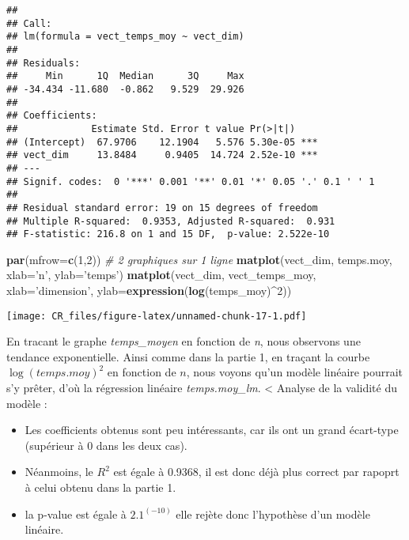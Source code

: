 \documentclass[
]{article}
\newenvironment{Shaded}{\begin{snugshade}}{\end{snugshade}}
\newcommand{\CommentTok}[1]{\textcolor[rgb]{0.56,0.35,0.01}{\textit{#1}}}
\newcommand{\DataTypeTok}[1]{\textcolor[rgb]{0.13,0.29,0.53}{#1}}
\newcommand{\DecValTok}[1]{\textcolor[rgb]{0.00,0.00,0.81}{#1}}
\newcommand{\KeywordTok}[1]{\textcolor[rgb]{0.13,0.29,0.53}{\textbf{#1}}}
\newcommand{\NormalTok}[1]{#1}
\newcommand{\OperatorTok}[1]{\textcolor[rgb]{0.81,0.36,0.00}{\textbf{#1}}}
\newcommand{\StringTok}[1]{\textcolor[rgb]{0.31,0.60,0.02}{#1}}
\providecommand{\tightlist}{%
  \setlength{\itemsep}{0pt}\setlength{\parskip}{0pt}}
\begin{document}
\begin{verbatim}
## 
## Call:
## lm(formula = vect_temps_moy ~ vect_dim)
## 
## Residuals:
##     Min      1Q  Median      3Q     Max 
## -34.434 -11.680  -0.862   9.529  29.926 
## 
## Coefficients:
##             Estimate Std. Error t value Pr(>|t|)    
## (Intercept)  67.9706    12.1904   5.576 5.30e-05 ***
## vect_dim     13.8484     0.9405  14.724 2.52e-10 ***
## ---
## Signif. codes:  0 '***' 0.001 '**' 0.01 '*' 0.05 '.' 0.1 ' ' 1
## 
## Residual standard error: 19 on 15 degrees of freedom
## Multiple R-squared:  0.9353, Adjusted R-squared:  0.931 
## F-statistic: 216.8 on 1 and 15 DF,  p-value: 2.522e-10
\end{verbatim}

\begin{Shaded}
\begin{Highlighting}[]
\KeywordTok{par}\NormalTok{(}\DataTypeTok{mfrow=}\KeywordTok{c}\NormalTok{(}\DecValTok{1}\NormalTok{,}\DecValTok{2}\NormalTok{)) }\CommentTok{# 2 graphiques sur 1 ligne}
\KeywordTok{matplot}\NormalTok{(vect_dim, temps.moy, }\DataTypeTok{xlab=}\StringTok{'n'}\NormalTok{, }\DataTypeTok{ylab=}\StringTok{'temps'}\NormalTok{)}
\KeywordTok{matplot}\NormalTok{(vect_dim, vect_temps_moy, }\DataTypeTok{xlab=}\StringTok{'dimension'}\NormalTok{, }\DataTypeTok{ylab=}\KeywordTok{expression}\NormalTok{(}\KeywordTok{log}\NormalTok{(temps_moy)}\OperatorTok{^}\DecValTok{2}\NormalTok{))}
\end{Highlighting}
\end{Shaded}

\texttt{[image: CR\_files/figure-latex/unnamed-chunk-17-1.pdf]}

En tracant le graphe \emph{temps\_moyen} en fonction de \emph{n}, nous
observons une tendance exponentielle. Ainsi comme dans la partie 1, en
traçant la courbe \(\log(temps.moy)^2\) en fonction de \(n\), nous
voyons qu'un modèle linéaire pourrait s'y prêter, d'où la régression
linéaire \emph{temps.moy\_lm}. \textless{} Analyse de la validité du
modèle :

\begin{itemize}
\tightlist
\item
  Les coefficients obtenus sont peu intéressants, car ils ont un grand
  écart-type (supérieur à 0 dans les deux cas).
\item
  Néanmoins, le \(R^2\) est égale à 0.9368, il est donc déjà plus
  correct par rapoprt à celui obtenu dans la partie 1.
\item
  la p-value est égale à \(2.1^(-10)\) elle rejète donc l'hypothèse d'un
  modèle linéaire.
\end{itemize}
\end{document}
